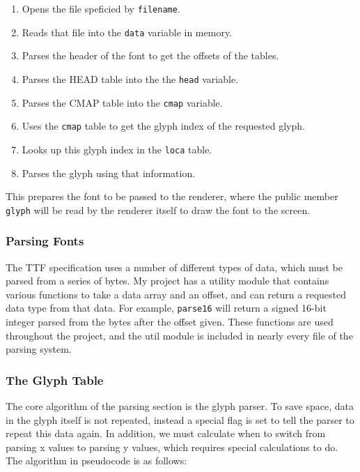 \documentclass{report}
\begin{document}
\begin{enumerate}
\item Opens the file speficied by \texttt{filename}.
\item Reads that file into the \texttt{data} variable in memory.
\item Parses the header of the font to get the offsets of the tables.
\item Parses the HEAD table into the the \texttt{head} variable.
\item Parses the CMAP table into the \texttt{cmap} variable.
\item Uses the \texttt{cmap} table to get the glyph index of the requested glyph.
\item Looks up this glyph index in the \texttt{loca} table.
\item Parses the glyph using that information. 
\end{enumerate}

This prepares the font to be passed to the renderer, where the public member
\texttt{glyph} will be read by the renderer itself to draw the font to the screen.

\subsubsection{Parsing Fonts}

The TTF specification uses a number of different types of data, which must be
parsed from a series of bytes. My project has a utility module that contains
various functions to take a data array and an offset, and can return a requested
data type from that data. For example, \texttt{parse16} will return a signed 16-bit
integer parsed from the bytes after the offset given. These functions are used
throughout the project, and the util module is included in nearly every file of
the parsing system.

\subsubsection{The Glyph Table}

The core algorithm of the parsing section is the glyph parser. To save space,
data in the glyph itself is not repeated, instead a special flag is set to tell
the parser to repeat this data again. In addition, we must calculate when to
switch from parsing x values to parsing y values, which requires special
calculations to do. The algorithm in pseudocode is as follows:
\end{document}
